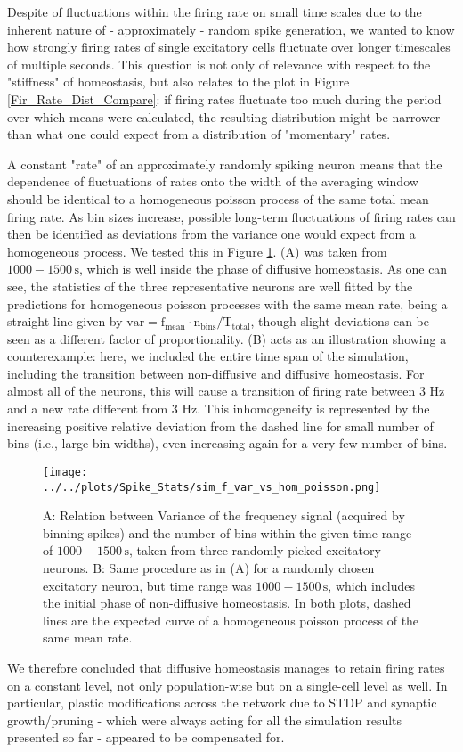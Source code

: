 \documentclass[10pt,a4paper]{article}
\begin{document}
Despite of fluctuations within the firing rate on small time scales due to the inherent nature of - approximately - random spike generation, we wanted to know how strongly firing rates of single excitatory cells fluctuate over longer timescales of multiple seconds. This question is not only of relevance with respect to the "stiffness" of homeostasis, but also relates to the plot in Figure \ref{Fir_Rate_Dist_Compare}: if firing rates fluctuate too much during the period over which means were calculated, the resulting distribution might be narrower than what one could expect from a distribution of "momentary" rates.

A constant "rate" of an approximately randomly spiking neuron means that the dependence of fluctuations of rates onto the width of the averaging window should be identical to a homogeneous poisson process of the same total mean firing rate. As bin sizes increase, possible long-term fluctuations of firing rates can then be identified as deviations from the variance one would expect from a homogeneous process. We tested this in Figure \ref{f_Var_vs_n_Bin}. (A) was taken from $\mathrm{1000-1500\,s}$, which is well inside the phase of diffusive homeostasis. As one can see, the statistics of the three representative neurons are well fitted by the predictions for homogeneous poisson processes with the same mean rate, being a straight line given by $\mathrm{var = f_{mean}\cdot n_{bins}/T_{total}}$, though slight deviations can be seen as a different factor of proportionality. (B) acts as an illustration showing a counterexample: here, we included the entire time span of the simulation, including the transition between non-diffusive and diffusive homeostasis. For almost all of the neurons, this will cause a transition of firing rate between 3 Hz and a new rate different from 3 Hz. This inhomogeneity is represented by the increasing positive relative deviation from the dashed line for small number of bins (i.e., large bin widths), even increasing again for a very few number of bins.
\begin{figure}
\texttt{[image: ../../plots/Spike\_Stats/sim\_f\_var\_vs\_hom\_poisson.png]}
\caption{A: Relation between Variance of the frequency signal (acquired by binning spikes) and the number of bins within the given time range of $\mathrm{1000-1500\,s}$, taken from three randomly picked excitatory neurons. B: Same procedure as in (A) for a randomly chosen excitatory neuron, but time range was $\mathrm{1000-1500\,s}$, which includes the initial phase of non-diffusive homeostasis. In both plots, dashed lines are the expected curve of a homogeneous poisson process of the same mean rate.}
\label{f_Var_vs_n_Bin}
\end{figure}
We therefore concluded that diffusive homeostasis manages to retain firing rates on a constant level, not only population-wise but on a single-cell level as well. In particular, plastic modifications across the network due to STDP and synaptic growth/pruning - which were always acting for all the simulation results presented so far - appeared to be compensated for.
\end{document}
